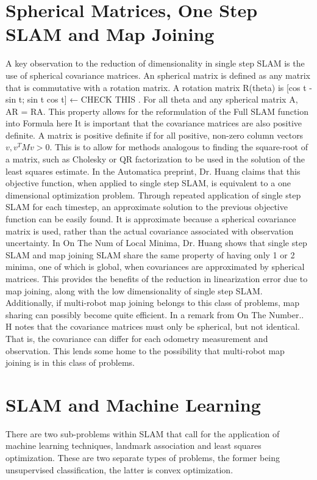 \documentclass[12pt]{report}
\begin{document}
\section{ Spherical Matrices, One Step SLAM and Map Joining}
A key observation to the reduction of dimensionality in single step SLAM is the 	use of spherical covariance matrices.  An spherical matrix is defined as any matrix that is commutative with a rotation matrix.  A rotation matrix R(theta) is [cos t -sin t; sin t cos t] ← CHECK THIS  .  For all theta and any spherical matrix A, AR = RA.  
This property allows for the reformulation of the Full SLAM function into 
Formula here
It is important that the covariance matrices are also positive definite.  A matrix is positive definite if for all positive, non-zero column vectors $v, v^T Mv > 0$. This is to allow for methods analogous to finding the square-root of a matrix, such as Cholesky or QR factorization to be used in the solution of the least squares estimate. 
In the Automatica preprint, Dr. Huang claims that this objective function, when applied to single step SLAM, is equivalent to a one dimensional optimization problem.  Through repeated application of single step SLAM for each timestep, an approximate solution to the previous objective function can be easily found.  It is approximate because a spherical covariance matrix is used, rather than the actual covariance associated with observation uncertainty.
In On The Num of Local Minima, Dr. Huang shows that single step SLAM and map joining SLAM share the same property of having only 1 or 2 minima, one of which is global, when covariances are approximated by spherical matrices.  This provides the benefits of the reduction in linearization error due to map joining, along with the low dimensionality of single step SLAM.  Additionally, if multi-robot map joining belongs to this class of problems, map sharing can possibly become quite efficient.
In a remark from On The Number.. H notes that the covariance matrices must only be spherical, but not identical.  That is, the covariance can differ for each odometry measurement and observation.  This lends some home to the possibility that multi-robot map joining is in this class of problems.

\section{SLAM and Machine Learning}

	There are two sub-problems within SLAM that call for the application of machine learning techniques, landmark association and least squares optimization.  These are two separate types of problems, the former being unsupervised classification, the latter is convex optimization.
\end{document}
